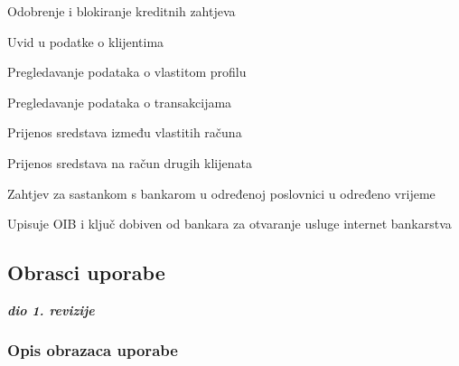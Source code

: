 \begin{packed_enum}
				\item	{}
				
				\begin{packed_enum}
					
					\item Odobrenje i blokiranje kreditnih zahtjeva
					\item Uvid u podatke o klijentima
					
				\end{packed_enum}
				
				\item	{}
				
				\begin{packed_enum}
					
					\item Pregledavanje podataka o vlastitom profilu
					\item Pregledavanje podataka o transakcijama
					\item Prijenos sredstava između vlastitih računa
					\item Prijenos sredstava na račun drugih klijenata
					\item Zahtjev za sastankom s bankarom u određenoj poslovnici u određeno vrijeme
					
				\end{packed_enum}
				
				\item	{}
				
				\begin{packed_enum}
					
					\item Upisuje OIB i ključ dobiven od bankara za otvaranje usluge internet bankarstva
					
				\end{packed_enum}
			
			\end{packed_enum}
			
			\eject 
			
			
				
			\subsection{Obrasci uporabe}
				
				\textbf{\textit{dio 1. revizije}}
				
				\subsubsection{Opis obrazaca uporabe}
				
